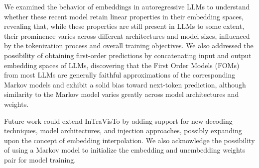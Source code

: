 \documentclass[11pt,a4paper,twocolumn]{article}
\begin{document}
We examined the behavior of embeddings in autoregressive LLMs to understand whether these recent model retain linear properties in their embedding spaces, revealing that, while these properties are still present in LLMs to some extent, their prominence varies across different architectures and model sizes, influenced by the tokenization process and overall training objectives.
We also addressed the possibility of obtaining first-order predictions by concatenating input and output embedding spaces of LLMs, discovering that the First Order Models (FOMs) from most LLMs are generally faithful approximations of the corresponding Markov models and exhibit a solid bias toward next-token prediction, although similarity to the Markov model varies greatly across model architectures and weights.

Future work could extend InTraVisTo by adding support for new decoding techniques, model architectures, and injection approaches, possibly expanding upon the concept of embedding interpolation.
We also acknowledge the possibility of using a Markov model to initialize the embedding and unembedding weights pair for model training.

\end{document}
